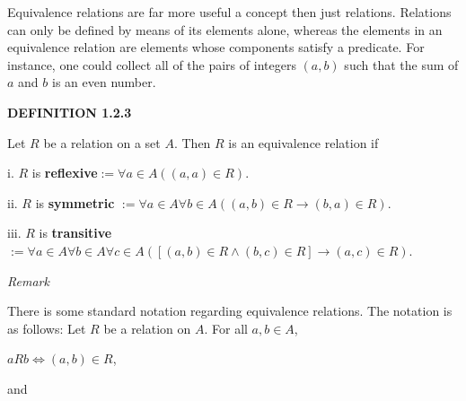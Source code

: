 \documentclass[12pt, a4paper]{article}
\begin{document}
\noindent Equivalence relations are far more useful a concept then just relations. Relations can only be defined by means of its elements alone, whereas the elements in an equivalence relation are elements whose components satisfy a predicate. For instance, one could collect all of the pairs of integers $(a,b)$ such that the sum of $a$ and $b$ is an even number.\par

\vspace{6mm}

\noindent\blacksquare\textbf{ DEFINITION 1.2.3}\par

\vspace{4mm}

Let $R$ be a relation on a set $A$. Then $R$ is an equivalence relation if\par

\begin{description}

    \item i. $R$ is \textbf{reflexive\hspace{7mm}}$:=\forall a\in A((a,a)\in R)$.

    \item ii. $R$ is \textbf{symmetric }$ :=\forall a\in A\forall b\in A((a,b)\in R\rightarrow(b,a)\in R)$.

    \item iii. $R$ is \textbf{transitive\hspace{3mm}}$ :=\forall a\in A\forall b\in A\forall c\in A([(a,b)\in R\wedge(b,c)\in R]\rightarrow(a,c)\in R)$.

\end{description}

\newpage

\noindent\large\textit{Remark}\normalsize\par

\vspace{4mm}

\noindent There is some standard notation regarding equivalence relations. The notation is as follows: Let $R$ be a relation on $A$. For all $a,b\in A$,\par

\vspace{4mm}

\centerline{$aRb\Leftrightarrow (a,b)\in R$,}

\vspace{4mm}

and
\end{document}
